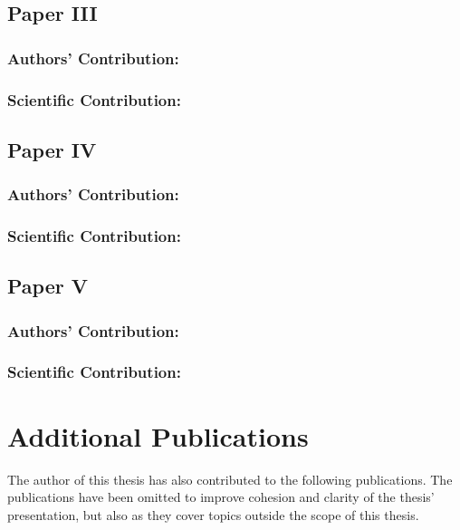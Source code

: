 \subsection*{Paper III}%
%
\begin{quote}
\end{quote}

\subsubsection*{Authors' Contribution:}%
%
\subsubsection*{Scientific Contribution:}%
%
    
\subsection*{Paper IV}%
%
\begin{quote}
\end{quote}

\subsubsection*{Authors' Contribution:}%
%
\subsubsection*{Scientific Contribution:}%
%

\subsection*{Paper V}%
%
\begin{quote}
\end{quote}

\subsubsection*{Authors' Contribution:}%
%
\subsubsection*{Scientific Contribution:}%
%

\section{Additional Publications}%
\label{sec:additional-publications}%
%
The author of this thesis has also contributed to the following publications.
The publications have been omitted to improve cohesion and clarity of the thesis' presentation, but also as they cover topics outside the scope of this thesis.


